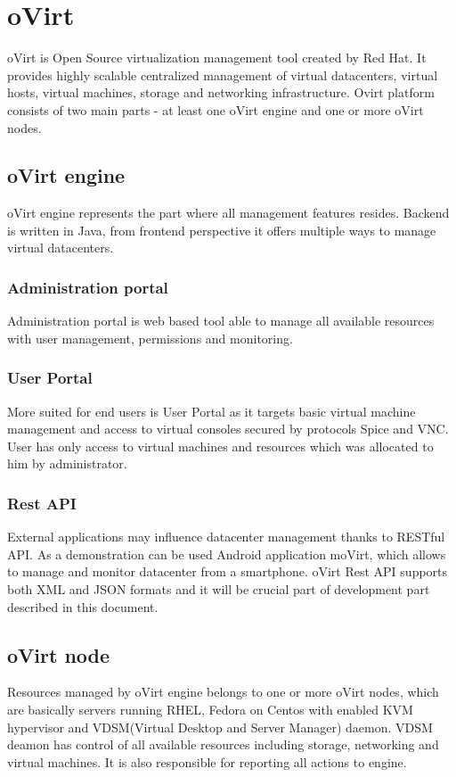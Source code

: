 \chapter{oVirt}
oVirt is Open Source virtualization management tool created by Red Hat. It provides highly scalable centralized management of virtual datacenters, virtual hosts, virtual machines, storage and networking infrastructure. Ovirt platform consists of two main parts - at least one oVirt engine and one or more oVirt nodes.

\section{oVirt engine}
oVirt engine represents the part where all management features resides. Backend is written in Java, from frontend perspective it offers multiple ways to manage virtual datacenters.

\subsection{Administration portal}
Administration portal is web based tool able to manage all available resources with user management, permissions and monitoring. 

\subsection{User Portal}
More suited for end users is User Portal as it targets basic virtual machine management and access to virtual consoles secured by protocols Spice and VNC. User has only access to virtual machines and resources which was allocated to him by administrator.

\subsection{Rest API}
External applications may influence datacenter management thanks to RESTful API. As a demonstration can be used Android application moVirt, which allows to manage and monitor datacenter from a smartphone. oVirt Rest API supports both XML and JSON formats and it will be crucial part of development part described in this document.

\section{oVirt node}
Resources managed by oVirt engine belongs to one or more oVirt nodes, which are basically servers running RHEL, Fedora on Centos with enabled KVM hypervisor and VDSM(Virtual Desktop and Server Manager) daemon. VDSM deamon has control of all available resources including storage, networking and virtual machines. It is also responsible for reporting all actions to engine.

